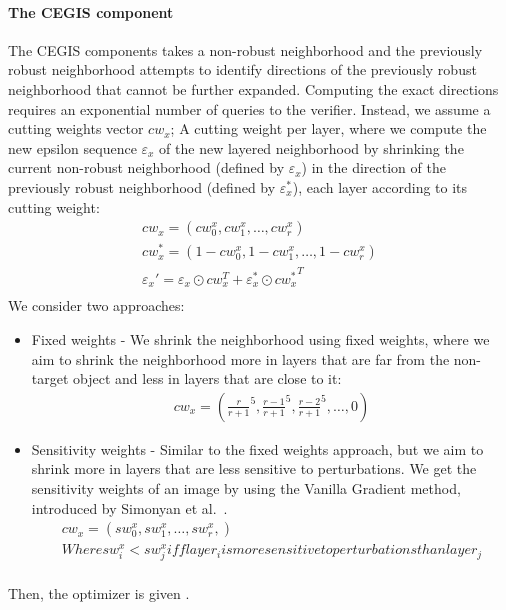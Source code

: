     \paragraph{The CEGIS component}
    The CEGIS components takes a non-robust neighborhood and the previously robust neighborhood attempts to identify directions of the previously robust neighborhood that cannot be further expanded. %
    Computing the exact directions requires an exponential number of queries to the verifier.
    Instead, we assume a cutting weights vector $cw_x$;
    A cutting weight per layer, where we compute the new epsilon sequence $\varepsilon_x$ of the new layered neighborhood by shrinking the current non-robust neighborhood (defined by $\varepsilon_x$) in the direction of the previously robust neighborhood (defined by $\varepsilon_x^*$), each layer according to its cutting weight:
    \begin{gather*}
        cw_x = (cw_0^x, cw_1^x, \ldots, cw_r^x)\\
        cw_x^* = (1 - cw_0^x, 1 - cw_1^x, \ldots, 1 - cw_r^x)\\
        {\varepsilon_x}' = \varepsilon_x \odot cw_x^T + \varepsilon_x^* \odot {cw_x^*}^T\\
    \end{gather*}
    We consider two approaches:
    \begin{itemize}
        \item Fixed weights - We shrink the neighborhood using fixed weights, where we aim to shrink the neighborhood more in layers that are far from the non-target object and less in layers that are close to it:
        \begin{gather*}
            cw_x = ({\frac{r}{r+1}}^5, {\frac{r-1}{r+1}}^5, {\frac{r-2}{r+1}}^5, \ldots, 0)
        \end{gather*}
        \item Sensitivity weights - Similar to the fixed weights approach, but we aim to shrink more in layers that are less sensitive to perturbations.
        We get the sensitivity weights of an image by using the Vanilla Gradient method, introduced by Simonyan et al.~\cite{VANILLAGRADIENT}.
        \begin{gather*}
            cw_x = (sw_0^x, sw_1^x, \ldots, sw_r^x,)\\
            Where sw_i^x < sw_j^x iff layer_i is more sensitive to perturbations than layer_j\\
        \end{gather*}
    \end{itemize}
    Then, the optimizer is given . %


